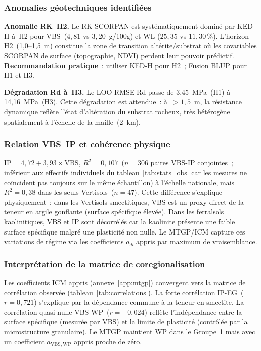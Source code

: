 \documentclass[10pt,a4paper,twocolumn]{article}
\begin{document}
	\subsubsection{Anomalies géotechniques identifiées}
	
	\textbf{Anomalie RK~H2.}
	Le RK-SCORPAN est systématiquement dominé par KED-H à~H2
	pour VBS~($4{,}81$ vs $3{,}20$~g/100g) et WL
	($25{,}35$ vs $11{,}30$\,\%).
	L'horizon H2~(1{,}0--1{,}5~m) constitue la zone de transition
	altérite/substrat où les covariables SCORPAN de surface
	(topographie, NDVI) perdent leur pouvoir prédictif.
	\textbf{Recommandation pratique}~: utiliser KED-H pour H2~;
	Fusion BLUP pour H1 et H3.
	
	\textbf{Dégradation Rd à~H3.}
	Le LOO-RMSE Rd passe de 3{,}45~MPa~(H1) à 14{,}16~MPa~(H3).
	Cette dégradation est attendue~: à~$>1{,}5$~m, la résistance
	dynamique reflète l'état d'altération du substrat rocheux, très
	hétérogène spatialement à l'échelle de la maille~(2~km).
	
	\subsubsection{Relation VBS--IP et cohérence physique}
	
	$\mathrm{IP}=4{,}72+3{,}93\times\mathrm{VBS}$,
	$R^2=0{,}107$~($n=306$ paires VBS-IP conjointes~; inférieur aux
	effectifs individuels du tableau~\ref{tab:stats_obs} car les mesures
	ne coïncident pas toujours sur le même échantillon) à l'échelle
	nationale, mais $R^2=0{,}38$ dans les seuls Vertisols~($n=47$).
	Cette différence s'explique physiquement~: dans les Vertisols
	smectitiques, VBS est un proxy direct de la teneur en argile
	gonflante (surface spécifique élevée). Dans les ferralsols
	kaolinitiques, VBS et IP sont décorrélés car la kaolinite
	présente une faible surface spécifique malgré une plasticité
	non nulle. Le MTGP/ICM capture ces variations de régime
	via les coefficients $a_{dl}$ appris par maximum de vraisemblance.
	
	\subsubsection{Interprétation de la matrice de coregionalisation}
	
	Les coefficients ICM appris (annexe~\ref{app:mtgp}) convergent
	vers la matrice de corrélation observée
	(tableau~\ref{tab:correlations}).
	La forte corrélation IP-EG~($r=0{,}721$) s'explique par la
	dépendance commune à la teneur en smectite.
	La corrélation quasi-nulle VBS-WP~($r=-0{,}024$) reflète
	l'indépendance entre la surface spécifique (mesurée par VBS)
	et la limite de plasticité (contrôlée par la microstructure
	granulaire). Le MTGP maintient WP dans le Groupe~1 mais avec
	un coefficient $a_{\mathrm{VBS,WP}}$ appris proche de zéro.
	
\end{document}
